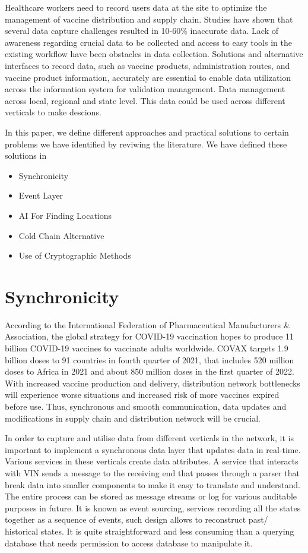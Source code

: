 \documentclass{article}
\begin{document}
Healthcare workers need to record users data at the site to optimize the management of vaccine distribution and supply chain. Studies have shown that several data capture challenges resulted in 10-60\% inaccurate data\cite{atkinson2020digital}. Lack of awareness regarding crucial data to be collected and access to easy tools in the existing workflow have been obstacles in data collection. Solutions and alternative interfaces to record data, such as vaccine products, administration routes, and vaccine product information, accurately are essential to enable data utilization across the information system for validation management. Data management across local, regional and state level. This data could be used across different verticals to make descions. 

In this paper, we define different approaches and practical solutions to certain problems we have identified by reviwing the literature. We have defined these solutions in 

\begin{itemize}
	\item Synchronicity
	\item Event Layer
	\item AI For Finding Locations
	\item Cold Chain Alternative
	\item Use of Cryptographic Methods
\end{itemize}

\section{Synchronicity}
According to the International Federation of Pharmaceutical Manufacturers & Association, the global strategy for COVID-19 vaccination hopes to produce 11 billion COVID-19 vaccines to vaccinate adults worldwide. COVAX targets 1.9 billion doses to 91 countries in fourth quarter of 2021, that includes 520 million doses to Africa in 2021 and about 850 million doses in the first quarter of 2022. With increased vaccine production and delivery, distribution network bottlenecks will experience worse situations and increased risk of more vaccines expired before use. Thus, synchronous and smooth communication, data updates and modifications in supply chain and distribution network will be crucial.   

In order to capture and utilise data from different verticals in the network, it is important to implement a synchronous data layer that updates data in real-time. Various services in these verticals create data attributes. A service that interacts with VIN sends a message to the receiving end that passes through a parser that break data into smaller components to make it easy to translate and understand. The entire process can be stored as message streams or log for various auditable purposes in future. It is known as event sourcing, services recording all the states together as a sequence of events, such design allows to reconstruct past/ historical states. It is quite straightforward and less consuming than a querying database that needs permission to access database to manipulate it.
\end{document}
